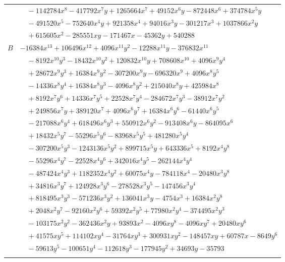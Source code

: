 \documentclass[11pt]{article}
\begin{document}
\begin{longtable}{@{}ll@{}}
 & $\quad -1142784x^{8}-417792x^{7}y+1265664x^{7}+49152x^{6}y-872448x^{6}+374784x^{5}y$\\
 & $\quad -491520x^{5}-752640x^{4}y+921358x^{4}+94016x^{3}y-301217x^{3}+1037866x^{2}y$\\
 & $\quad +615605x^{2}-285551xy-171467x-45362y+540288$\\
$B$ & $-16384x^{13}+106496x^{12}+4096x^{11}y^{2}-12288x^{11}y-376832x^{11}$\\
 & $\quad -8192x^{10}y^{3}-18432x^{10}y^{2}+120832x^{10}y+708608x^{10}+4096x^{9}y^{4}$\\
 & $\quad +28672x^{9}y^{3}+16384x^{9}y^{2}-307200x^{9}y-696320x^{9}+4096x^{8}y^{5}$\\
 & $\quad -14336x^{8}y^{4}+16384x^{8}y^{3}-4096x^{8}y^{2}+215040x^{8}y+425984x^{8}$\\
 & $\quad +8192x^{7}y^{6}+14336x^{7}y^{5}+22528x^{7}y^{4}-284672x^{7}y^{3}-38912x^{7}y^{2}$\\
 & $\quad +249856x^{7}y+389120x^{7}+4096x^{6}y^{7}+16384x^{6}y^{6}-61440x^{6}y^{5}$\\
 & $\quad -217088x^{6}y^{4}+618496x^{6}y^{3}+550912x^{6}y^{2}-913408x^{6}y-864095x^{6}$\\
 & $\quad +18432x^{5}y^{7}-55296x^{5}y^{6}-83968x^{5}y^{5}+481280x^{5}y^{4}$\\
 & $\quad -307200x^{5}y^{3}-1243136x^{5}y^{2}+899715x^{5}y+643336x^{5}+8192x^{4}y^{8}$\\
 & $\quad -55296x^{4}y^{7}-22528x^{4}y^{6}+342016x^{4}y^{5}-262144x^{4}y^{4}$\\
 & $\quad -487424x^{4}y^{3}+1182352x^{4}y^{2}+60075x^{4}y-784118x^{4}-20480x^{3}y^{8}$\\
 & $\quad +34816x^{3}y^{7}+124928x^{3}y^{6}-278528x^{3}y^{5}-147456x^{3}y^{4}$\\
 & $\quad +818495x^{3}y^{3}-571236x^{3}y^{2}+136041x^{3}y-4754x^{3}+16384x^{2}y^{8}$\\
 & $\quad +2048x^{2}y^{7}-92160x^{2}y^{6}+59392x^{2}y^{5}+77980x^{2}y^{4}-374495x^{2}y^{3}$\\
 & $\quad -103175x^{2}y^{2}-362436x^{2}y+93893x^{2}-4096xy^{8}-4096xy^{7}+20480xy^{6}$\\
 & $\quad +41575xy^{5}+114102xy^{4}-31764xy^{3}+300931xy^{2}-148457xy+60787x-8649y^{6}$\\
 & $\quad -59613y^{5}-100651y^{4}-112618y^{3}-177945y^{2}+34693y-35793$\\
\addlinespace[3pt]
\multicolumn{2}{@{}l}{$i=9$, $m=4$, neighbours $7,18,44,49,56,57,58,63,64,96$}\\

\end{longtable}
\end{document}
